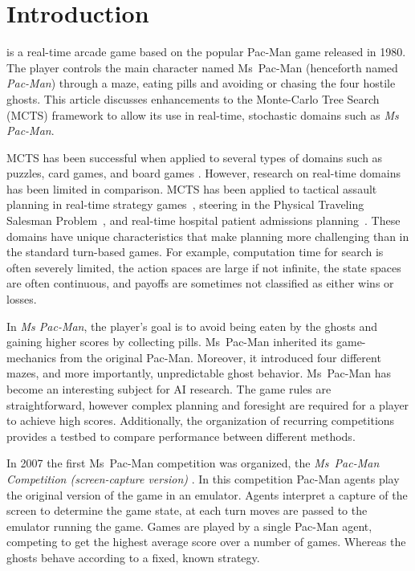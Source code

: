 \documentclass[journal]{IEEEtran}
\begin{document}
\section{Introduction}
 is a real-time arcade game based on the popular Pac-Man game released in 1980. The player controls the main character named Ms~Pac-Man (henceforth named \emph{Pac-Man}) through a maze, eating pills and avoiding or chasing the four hostile ghosts. This article discusses enhancements to the Monte-Carlo Tree Search (MCTS) \cite{kocsis2006bandit, coulom2007efficient} framework to allow its use in real-time, stochastic domains such as {\it{Ms Pac-Man}}. 

MCTS has been successful when applied to several types of domains such as puzzles, card games, and board games \cite{brownesurvey}. However, research on real-time domains has been limited in comparison. MCTS has been applied to tactical assault planning in real-time strategy games~\cite{balla2009uct}, steering in the Physical Traveling Salesman Problem~\cite{powleytsp}, and real-time hospital patient admissions planning~\cite{zhu13realtime}. These domains have unique characteristics that make planning more challenging than in the standard turn-based games. For example, computation time for search is often severely limited, the action spaces are large if not infinite, the state spaces are often continuous, and payoffs are sometimes not classified as either wins or losses. 

In {\it{Ms Pac-Man}}, the player's goal is to avoid being eaten by the ghosts and gaining higher scores by collecting pills. Ms~Pac-Man inherited its game-mechanics from the original Pac-Man. Moreover, it introduced four different mazes, and more importantly, unpredictable ghost behavior. Ms~Pac-Man has become an interesting subject for AI research. The game rules are straightforward, however complex planning and foresight are required for a player to achieve high scores. Additionally, the organization of recurring competitions provides a testbed to compare performance between different methods.

In 2007 the first Ms~Pac-Man competition was organized, the \emph{Ms~Pac-Man Competition (screen-capture version)} \cite{mspacmanscreencap}. In this competition Pac-Man agents play the original version of the game in an emulator. Agents interpret a capture of the screen to determine the game state, at each turn moves are passed to the emulator running the game. Games are played by a single Pac-Man agent, competing to get the highest average score over a number of games. Whereas the ghosts behave according to a fixed, known strategy.
\end{document}
